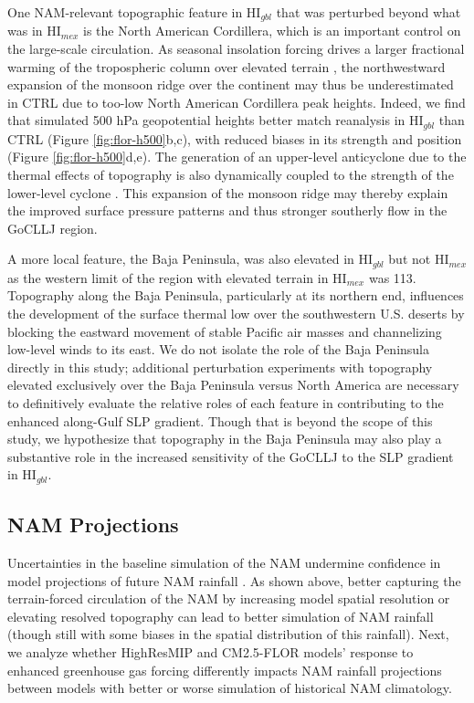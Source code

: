 \documentclass[draft]{agujournal2019}
\begin{document}
One NAM-relevant topographic feature in HI$_{gbl}$ that was perturbed beyond what was in HI$_{mex}$ is the North American Cordillera, which is an important control on the large-scale circulation. As seasonal insolation forcing drives a larger fractional warming of the tropospheric column over elevated terrain \cite{higgins04jc,johnson25pdt}, the northwestward expansion of the monsoon ridge over the continent may thus be underestimated in CTRL due to too-low North American Cordillera peak heights. Indeed, we find that simulated 500 hPa geopotential heights better match reanalysis in HI$_{gbl}$ than CTRL (Figure \ref{fig:flor-h500}b,c), with reduced biases in its strength and position (Figure \ref{fig:flor-h500}d,e). The generation of an upper-level anticyclone due to the thermal effects of topography is also dynamically coupled to the strength of the lower-level cyclone \cite{hoskins91tdmo,rowson92ijc,rodwell01jc}. This expansion of the monsoon ridge may thereby explain the improved surface pressure patterns and thus stronger southerly flow in the GoCLLJ region. 

A more local feature, the Baja Peninsula, was also elevated in HI$_{gbl}$ but not HI$_{mex}$ as the western limit of the region with elevated terrain in HI$_{mex}$ was 113. Topography along the Baja Peninsula, particularly at its northern end, influences the development of the surface thermal low over the southwestern U.S. deserts by blocking the eastward movement of stable Pacific air masses and channelizing low-level winds to its east. We do not isolate the role of the Baja Peninsula directly in this study; additional perturbation experiments with topography elevated exclusively over the Baja Peninsula versus North America are necessary to definitively evaluate the relative roles of each feature in contributing to the enhanced along-Gulf SLP gradient. Though that is beyond the scope of this study, we hypothesize that topography in the Baja Peninsula may also play a substantive role in the increased sensitivity of the GoCLLJ to the SLP gradient in HI$_{gbl}$.


\subsection{NAM Projections}
Uncertainties in the baseline simulation of the NAM undermine confidence in model projections of future NAM rainfall \cite{pascale17ncc}. As shown above, better capturing the terrain-forced circulation of the NAM by increasing model spatial resolution or elevating resolved topography can lead to better simulation of NAM rainfall (though still with some biases in the spatial distribution of this rainfall). Next, we analyze whether HighResMIP and CM2.5-FLOR models' response to enhanced greenhouse gas forcing differently impacts NAM rainfall projections between models with better or worse simulation of historical NAM climatology. 
\end{document}
